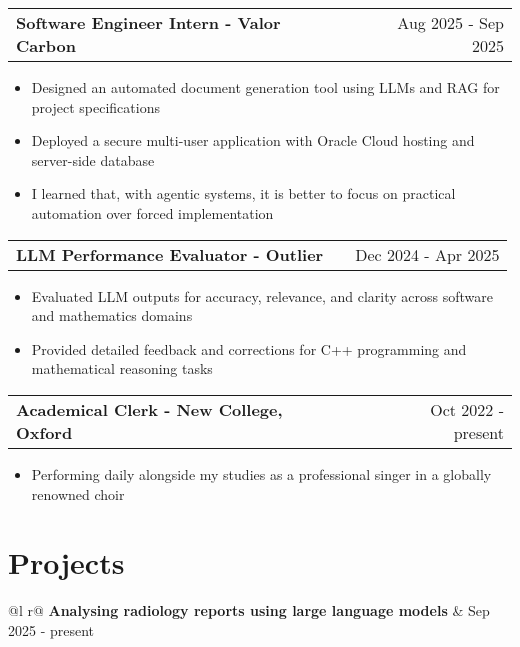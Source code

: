 \documentclass[a4paper,10pt]{article}
\makeatletter
\newenvironment{joblong}[2]
    {
    \begin{tabularx}{\linewidth}{@{}l X r@{}}
    \textbf{#1} & \hfill &  #2 \\[2pt]
    \end{tabularx}
    \begin{minipage}[t]{\linewidth}
    \begin{itemize}[nosep,after=\strut, leftmargin=1em, itemsep=1pt,label=--]
    }
    {
    \end{itemize}
    \end{minipage}    
    }
\makeatother
\begin{document}
\vspace{1pt}

\begin{joblong}{Software Engineer Intern - Valor Carbon}{Aug 2025 - Sep 2025}
\item Designed an automated document generation tool using LLMs and RAG for project specifications
\item Deployed a secure multi-user application with Oracle Cloud hosting and server-side database
\item I learned that, with agentic systems, it is better to focus on practical automation over forced implementation
\end{joblong}

\vspace{1pt}

\begin{joblong}{LLM Performance Evaluator - Outlier}{Dec 2024 - Apr 2025}
\item Evaluated LLM outputs for accuracy, relevance, and clarity across software and mathematics domains
\item Provided detailed feedback and corrections for C++ programming and mathematical reasoning tasks
\end{joblong}

\vspace{1pt}

\begin{joblong}{Academical Clerk - New College, Oxford}{Oct 2022 - present}
\item Performing daily alongside my studies as a professional singer in a globally renowned choir
\end{joblong}

\section{Projects}

\begin{tabularx}{\linewidth}{ @{}l r@{} }
\textbf{Analysing radiology reports using large language models} & \hfill Sep 2025 - present \\[2pt]
  \\
\end{tabularx}
\end{document}
